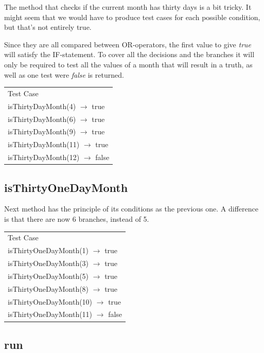 \documentclass[a4paper]{article}
\begin{document}
The method that checks if the current month has thirty days is a bit tricky. It might seem that we would have to produce test cases for each possible condition, but that's not entirely true. 

Since they are all compared between OR-operators, the first value to give \emph{true} will satisfy the IF-statement. To cover all the decisions and the branches it will only be required to test all the values of a month that will result in a truth, as well as one test were \emph{false} is returned.

\begin{table}[h]
	\begin{tabular}{l}
		Test Case\\
		isThirtyDayMonth(4) $\rightarrow$ true\\
		isThirtyDayMonth(6) $\rightarrow$ true\\
		isThirtyDayMonth(9) $\rightarrow$ true\\
		isThirtyDayMonth(11) $\rightarrow$ true\\		
		isThirtyDayMonth(12) $\rightarrow$ false\\
	\end{tabular}
\end{table}

\subsection*{isThirtyOneDayMonth}

Next method has the principle of its conditions as the previous one. A difference is that there are now 6 branches, instead of 5.

\begin{table}[h]
	\begin{tabular}{l}
		Test Case\\
		isThirtyOneDayMonth(1) $\rightarrow$ true\\
		isThirtyOneDayMonth(3) $\rightarrow$ true\\
		isThirtyOneDayMonth(5) $\rightarrow$ true\\
		isThirtyOneDayMonth(8) $\rightarrow$ true\\		
		isThirtyOneDayMonth(10) $\rightarrow$ true\\
		isThirtyOneDayMonth(11) $\rightarrow$ false\\
	\end{tabular}
\end{table}

\subsection*{run}
\end{document}
